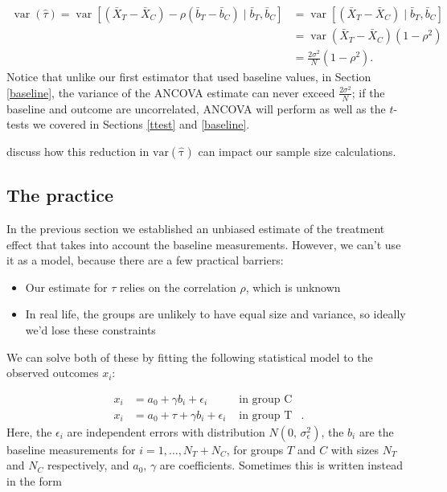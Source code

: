 \documentclass[
  openany]{book}
\providecommand{\tightlist}{%
  \setlength{\itemsep}{0pt}\setlength{\parskip}{0pt}}
\theoremstyle{definition}
\theoremstyle{definition}
\theoremstyle{definition}
\theoremstyle{definition}
\theoremstyle{remark}
\begin{document}
\[
\begin{aligned}
\operatorname{var}\left(\hat{\tau}\right) = \operatorname{var}\left[\left(\bar{X}_T - \bar{X}_C\right) - \rho\left(\bar{b}_T - \bar{b}_C\right)\mid{\bar{b}_T,\bar{b}_C}\right] &= \operatorname{var}\left[\left(\bar{X}_T - \bar{X}_C\right) \mid{\bar{b}_T,\bar{b}_C}\right]\\
& = \operatorname{var}\left(\bar{X}_T - \bar{X}_C\right)\left(1-\rho^2\right)\\
& = \frac{2\sigma^2}{N}\left(1-\rho^2\right).
\end{aligned}
\]
Notice that unlike our first estimator that used baseline values, in Section \ref{baseline}, the variance of the ANCOVA estimate can never exceed \(\frac{2\sigma^2}{N}\); if the baseline and outcome are uncorrelated, ANCOVA will perform as well as the \(t\)-tests we covered in Sections \ref{ttest} and \ref{baseline}.

\citet{borm2007simple} discuss how this reduction in \(\operatorname{var\left(\hat{\tau}\right)}\) can impact our sample size calculations.

\subsection{The practice}\label{ancova-practice}

In the previous section we established an unbiased estimate of the treatment effect that takes into account the baseline measurements. However, we can't use it as a model, because there are a few practical barriers:

\begin{itemize}
\tightlist
\item
  Our estimate for \(\tau\) relies on the correlation \(\rho\), which is unknown
\item
  In real life, the groups are unlikely to have equal size and variance, so ideally we'd lose these constraints
\end{itemize}

We can solve both of these by fitting the following statistical model to the observed outcomes \(x_i\):

\[
\begin{aligned}
x_i & = a_0 + \gamma b_i + \epsilon_i & \text{ in group C}\\
x_i & = a_0 + \tau + \gamma b_i + \epsilon_i & \text{ in group T}&.
\end{aligned}
\]
Here, the \(\epsilon_i\) are independent errors with distribution \(N\left(0,\,\sigma^2_\epsilon\right)\), the \(b_i\) are the baseline measurements for \(i=1,\ldots,N_T+N_C\), for groups \(T\) and \(C\) with sizes \(N_T\) and \(N_C\) respectively, and \(a_0,\,\gamma\) are coefficients. Sometimes this is written instead in the form
\end{document}
